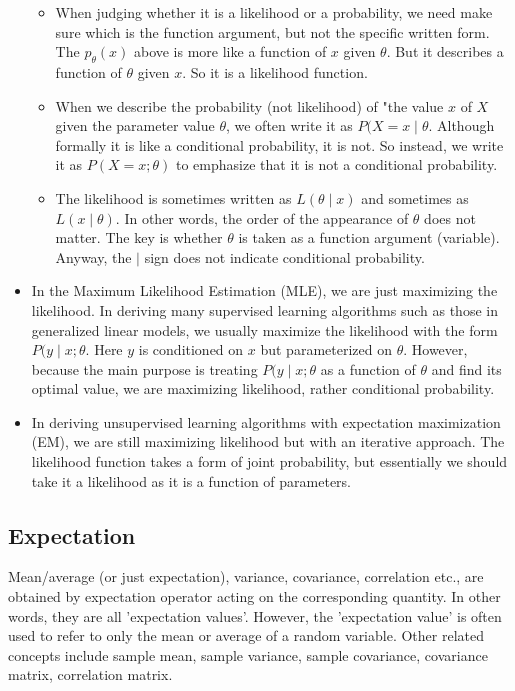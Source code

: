 \documentclass[11pt]{article}
\providecommand{\tightlist}{%
      \setlength{\itemsep}{0pt}\setlength{\parskip}{0pt}}
\begin{document}
\begin{itemize}
  \begin{itemize}
  \tightlist
  \item
    When judging whether it is a likelihood or a probability, we need
    make sure which is the function argument, but not the specific
    written form. The \(p_{\theta}(x)\) above is more like a function of
    \(x\) given \(\theta\). But it describes a function of \(\theta\)
    given \(x\). So it is a likelihood function.\\
  \item
    When we describe the probability (not likelihood) of "the value
    \(x\) of \(X\) given the parameter value \(\theta\), we often write
    it as \(P(X = x \mid \theta\). Although formally it is like a
    conditional probability, it is not. So instead, we write it as
    \(P(X = x; \theta)\) to emphasize that it is not a conditional
    probability.
  \item
    The likelihood is sometimes written as \(L(\theta \mid x)\) and
    sometimes as \(L(x\mid \theta)\). In other words, the order of the
    appearance of \(\theta\) does not matter. The key is whether
    \(\theta\) is taken as a function argument (variable). Anyway, the
    \(\mid\) sign does not indicate conditional probability.
  \end{itemize}
\item
  In the Maximum Likelihood Estimation (MLE), we are just maximizing the
  likelihood. In deriving many supervised learning algorithms such as
  those in generalized linear models, we usually maximize the likelihood
  with the form \(P(y\mid x; \theta\). Here \(y\) is conditioned on
  \(x\) but parameterized on \(\theta\). However, because the main
  purpose is treating \(P(y\mid x; \theta\) as a function of \(\theta\)
  and find its optimal value, we are maximizing likelihood, rather
  conditional probability.
\item
  In deriving unsupervised learning algorithms with expectation
  maximization (EM), we are still maximizing likelihood but with an
  iterative approach. The likelihood function takes a form of joint
  probability, but essentially we should take it a likelihood as it is a
  function of parameters.
\end{itemize}

    \subsection{Expectation}\label{expectation}

Mean/average (or just expectation), variance, covariance, correlation
etc., are obtained by expectation operator acting on the corresponding
quantity. In other words, they are all 'expectation values'. However,
the 'expectation value' is often used to refer to only the mean or
average of a random variable. Other related concepts include sample
mean, sample variance, sample covariance, covariance matrix, correlation
matrix.
\end{document}
